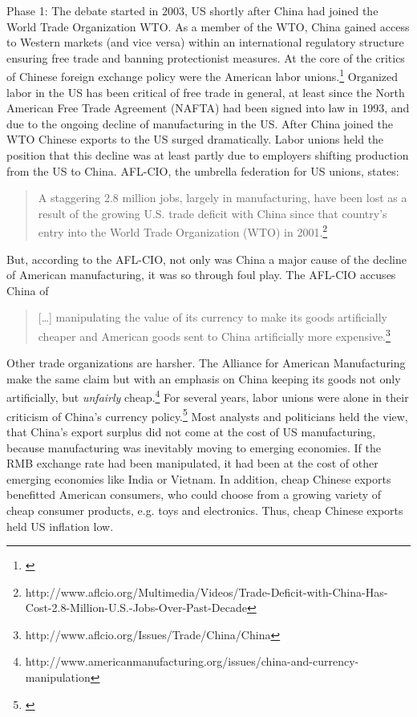 Phase 1: The debate started in 2003, US shortly after China had joined the World Trade Organization WTO. As a member of the WTO, China gained access to Western markets (and vice versa) within an international regulatory structure ensuring free trade and banning protectionist measures. At the core of the critics of Chinese foreign exchange policy were the American labor unions.\footnote{\cite[pp. 14]{Levy2011}} Organized labor in the US has been critical of free trade in general, at least since the North American Free Trade Agreement (NAFTA) had been signed into law in 1993, and due to the ongoing decline of manufacturing in the US. After China joined the WTO Chinese exports to the US surged dramatically. Labor unions held the position that this decline was at least partly due to employers shifting production from the US to China. AFL-CIO, the umbrella federation for US unions, states: 
\begin{quote}
A staggering 2.8 million jobs, largely in manufacturing, have been lost as a result of the growing U.S. trade deficit with China since that country's entry into the World Trade Organization (WTO) in 2001.\footnote{http://www.aflcio.org/Multimedia/Videos/Trade-Deficit-with-China-Has-Cost-2.8-Million-U.S.-Jobs-Over-Past-Decade}
\end{quote}
But, according to the AFL-CIO, not only was China a major cause of the decline of American manufacturing, it was so through foul play. The AFL-CIO accuses China of
\begin{quote}
[\dots] manipulating the value of its currency to make its goods artificially cheaper and American goods sent to China artificially more expensive.\footnote{http://www.aflcio.org/Issues/Trade/China/China}
\end{quote}
Other trade organizations are harsher. The Alliance for American Manufacturing make the same claim but with an emphasis on China keeping its goods not only artificially, but \emph{unfairly} cheap.\footnote{http://www.americanmanufacturing.org/issues/china-and-currency-manipulation}
For several years, labor unions were alone in their criticism of China's currency policy.\footnote{\cite[pp. 14]{Levy2011}} Most analysts and politicians held the view, that China's export surplus did not come at the cost of US manufacturing, because manufacturing was inevitably moving to emerging economies. If the RMB exchange rate had been manipulated, it had been at the cost of other emerging economies like India or Vietnam. In addition, cheap Chinese exports benefitted American consumers, who could choose from a growing variety of cheap consumer products, e.g. toys and electronics. Thus, cheap Chinese exports held US inflation low.

